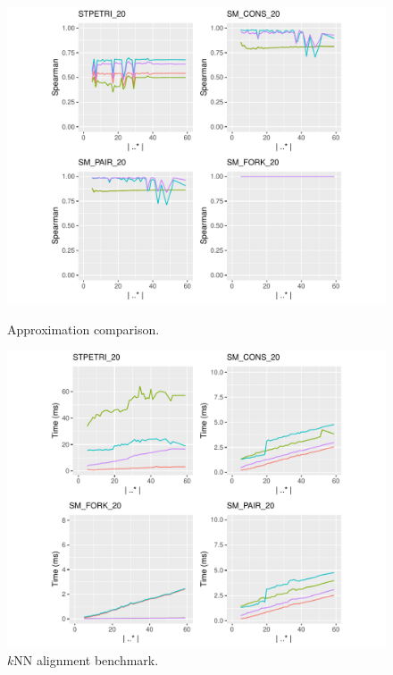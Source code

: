 \begin{figure}[!t]
\begin{minipage}{.49\textwidth}
	\includegraphics[width=1.1\textwidth]{images/Prec.pdf}
	\caption{Approximation comparison.}\label{fig:app}
\end{minipage}\hfill \begin{minipage}{.49\textwidth}

	\includegraphics[width=1.1\textwidth]{images/kronos.pdf}
	\caption{$k$NN alignment benchmark.}\label{fig:kronos}
\end{minipage}
\end{figure}
